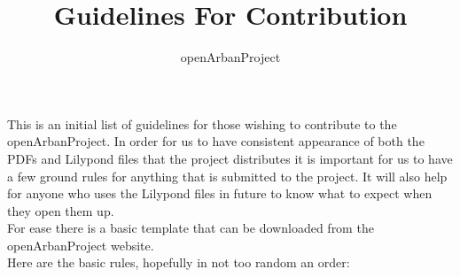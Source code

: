 \documentclass[12pt,a4paper]{article}
\author{openArbanProject}
\title{Guidelines For Contribution}
\begin{document}
\maketitle
This is an initial list of guidelines for those wishing to contribute to the openArbanProject.
In order for us to have consistent appearance of both the PDFs and Lilypond files that the project distributes it is important for us to have a few ground rules for anything that is submitted to the project. It will also help for anyone who uses the Lilypond files in future to know what to expect when they open them up.
\\For ease there is a basic template that can be downloaded from the openArbanProject website.
\\Here are the basic rules, hopefully in not too random an order:
\end{document}
